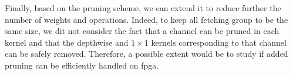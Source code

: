 Finally, based on the pruning scheme, we can extend it to reduce further the number of weights and operations. Indeed, to keep all fetching group to be the same size, we dit not consider the fact that a channel can be pruned in each kernel and that the depthwise and $1 \times 1$ kernels corresponding to that channel can be safely removed. Therefore, a possible extent would be to study if added pruning can be efficiently handled on \acrshort{fpga}.
\newpage
